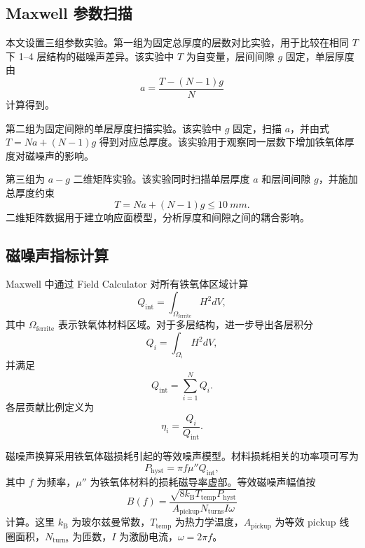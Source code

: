 \documentclass[UTF8,a4paper,12pt]{ctexart}
\begin{document}
\subsection{Maxwell 参数扫描}

本文设置三组参数实验。第一组为固定总厚度的层数对比实验，用于比较在相同 \(T\) 下 1--4 层结构的磁噪声差异。该实验中 \(T\) 为自变量，层间间隙 \(g\) 固定，单层厚度由
\begin{equation}
    a = \frac{T-(N-1)g}{N}
\end{equation}
计算得到。

第二组为固定间隙的单层厚度扫描实验。该实验中 \(g\) 固定，扫描 \(a\)，并由式
\(T=Na+(N-1)g\)
得到对应总厚度。该实验用于观察同一层数下增加铁氧体厚度对磁噪声的影响。

第三组为 \(a-g\) 二维矩阵实验。该实验同时扫描单层厚度 \(a\) 和层间间隙 \(g\)，并施加总厚度约束
\begin{equation}
    T = Na + (N-1)g \leq \SI{10}{mm}.
\end{equation}
二维矩阵数据用于建立响应面模型，分析厚度和间隙之间的耦合影响。

\subsection{磁噪声指标计算}

Maxwell 中通过 Field Calculator 对所有铁氧体区域计算
\begin{equation}
    Q_{\mathrm{int}} = \int_{\Omega_{\mathrm{ferrite}}} H^2 dV ,
\end{equation}
其中 \(\Omega_{\mathrm{ferrite}}\) 表示铁氧体材料区域。对于多层结构，进一步导出各层积分
\begin{equation}
    Q_i = \int_{\Omega_i} H^2 dV ,
\end{equation}
并满足
\begin{equation}
    Q_{\mathrm{int}} = \sum_{i=1}^{N} Q_i .
\end{equation}
各层贡献比例定义为
\begin{equation}
    \eta_i = \frac{Q_i}{Q_{\mathrm{int}}}.
\end{equation}

磁噪声换算采用铁氧体磁损耗引起的等效噪声模型。材料损耗相关的功率项可写为
\begin{equation}
    P_{\mathrm{hyst}} = \pi f \mu'' Q_{\mathrm{int}},
\end{equation}
其中 \(f\) 为频率，\(\mu''\) 为铁氧体材料的损耗磁导率虚部。等效磁噪声幅值按
\begin{equation}
    B(f) =
    \frac{\sqrt{8k_{\mathrm{B}}T_{\mathrm{temp}}P_{\mathrm{hyst}}}}
    {A_{\mathrm{pickup}}N_{\mathrm{turns}}I\omega}
\end{equation}
计算。这里 \(k_{\mathrm{B}}\) 为玻尔兹曼常数，\(T_{\mathrm{temp}}\) 为热力学温度，\(A_{\mathrm{pickup}}\) 为等效 pickup 线圈面积，\(N_{\mathrm{turns}}\) 为匝数，\(I\) 为激励电流，\(\omega=2\pi f\)。
\end{document}

